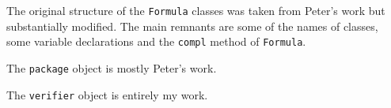 \documentclass[a4paper]{article}
\begin{document}
The original structure of the \texttt{Formula} classes was taken from Peter's work but substantially modified. The main remnants are some of the names of classes, some variable declarations and the \texttt{compl} method of \texttt{Formula}.

The \texttt{package} object is mostly Peter's work.

The \texttt{verifier} object is entirely my work.
\end{document}
